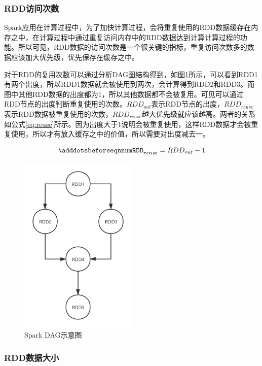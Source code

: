 \subsubsection{RDD访问次数}

Spark应用在计算过程中，为了加快计算过程，会将重复使用的RDD数据缓存在内存之中，在计算过程中通过重复访问内存中的RDD数据达到计算计算过程的功能。所以可见，RDD数据的访问次数是一个很关键的指标，重复访问次数多的数据应该加大优先级，优先保存在缓存之中。

对于RDD的复用次数可以通过分析DAG图结构得到，如图\ref{fig:spark-dag}所示，可以看到RDD1有两个出度，所以RDD1数据就会被使用到两次，会计算得到RDD2和RDD3。而图中其他RDD数据的出度都为1，所以其他数据都不会被复用。可见可以通过RDD节点的出度判断重复使用的次数。$RDD_{out}$表示RDD节点的出度，$RDD_{reuse}$表示RDD数据被重复使用的次数，$RDD_{reuse}$越大优先级就应该越高。两者的关系如公式\eqref{eq:reuse}所示。因为出度大于1说明会被重复使用，这样RDD数据才会被重复使用，所以才有放入缓存之中的价值，所以需要对出度减去一。

\begin{equation} \label{eq:reuse}
    \adddotsbeforeeqnnum%
    RDD_{reuse} = RDD_{out} - 1
\end{equation}

\begin{figure}[htbp]
    \centering
    \includegraphics[width=0.5\textwidth]{Img/DAG示意图.png}
    \caption{Spark DAG示意图}
    \label{fig:spark-dag}
\end{figure}

\subsubsection{RDD数据大小}

